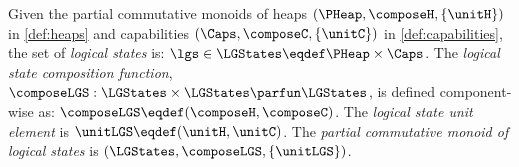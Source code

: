 
\begin{definition}
\label{def:logical_states}
Given the partial commutative monoids of heaps \( (\PHeap, \composeH, \{\unitH\}) \) in \ref{def:heaps} and capabilities $(\Caps, \composeC, \{\unitC\})$ in \ref{def:capabilities}, the set of \emph{logical states} is: \(\lgs \in \LGStates \eqdef \PHeap \times \Caps\).
The \emph{logical state composition function}, $\composeLGS: \LGStates \times \LGStates \parfun \LGStates$, is defined component-wise as: $\composeLGS \eqdef (\composeH, \composeC)$.
The \emph{logical state unit element} is $\unitLGS \eqdef (\unitH, \unitC)$.
The \emph{partial commutative monoid of logical states} is $(\LGStates, \composeLGS,\{\unitLGS\})$.
\end{definition}

